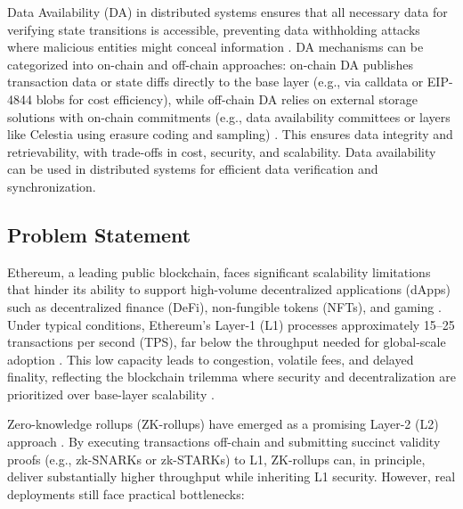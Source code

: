 Data Availability (DA) in distributed systems ensures that all necessary data for verifying state transitions is accessible, preventing data withholding attacks where malicious entities might conceal information \cite{motepalli2023sok}. DA mechanisms can be categorized into on-chain and off-chain approaches: on-chain DA publishes transaction data or state diffs directly to the base layer (e.g., via calldata or EIP-4844 blobs for cost efficiency), while off-chain DA relies on external storage solutions with on-chain commitments (e.g., data availability committees or layers like Celestia using erasure coding and sampling) \cite{gogol2025scalingdefi, lavaur2023modular}. This ensures data integrity and retrievability, with trade-offs in cost, security, and scalability.
Data availability can be used in distributed systems for efficient data verification and synchronization.


\vspace{12pt}
\subsection{Problem Statement}
\vspace{12pt}

Ethereum, a leading public blockchain, faces significant scalability limitations that hinder its ability to support high-volume decentralized applications (dApps) such as decentralized finance (DeFi), non-fungible tokens (NFTs), and gaming \cite{buterin2014ethereum}. Under typical conditions, Ethereum’s Layer-1 (L1) processes approximately 15--25 transactions per second (TPS), far below the throughput needed for global-scale adoption \cite{wood2014ethereum, zhou2020solutions}. This low capacity leads to congestion, volatile fees, and delayed finality, reflecting the blockchain trilemma where security and decentralization are prioritized over base-layer scalability \cite{fu2024trilemma}.

\vspace{12pt}

Zero-knowledge rollups (ZK-rollups) have emerged as a promising Layer-2 (L2) approach \cite{tran2023implementation}. By executing transactions off-chain and submitting succinct validity proofs (e.g., zk-SNARKs or zk-STARKs) to L1, ZK-rollups can, in principle, deliver substantially higher throughput while inheriting L1 security. However, real deployments still face practical bottlenecks: \cite{habib2025bottlenecks, chaliasos2024analyzing}

